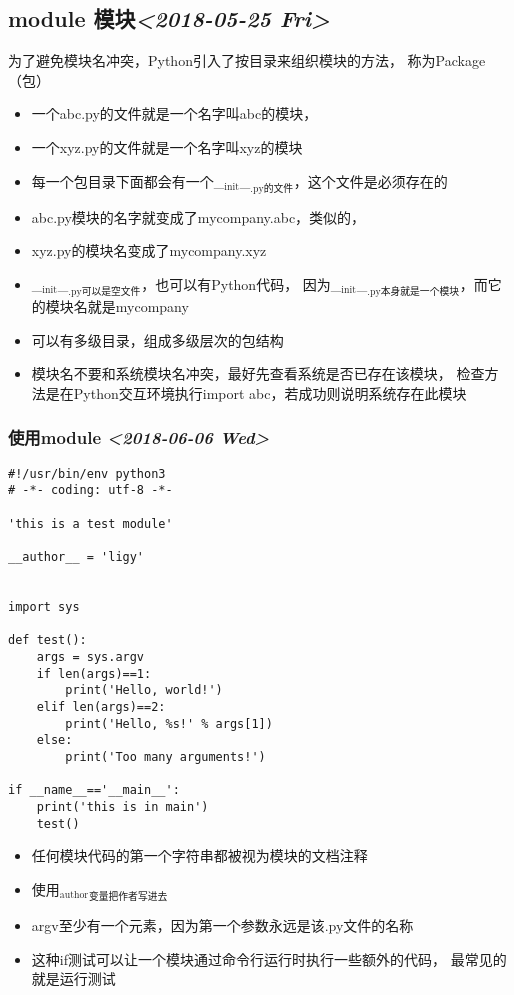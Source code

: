 \documentclass[11pt]{article}
\begin{document}
\subsection{module 模块\textit{<2018-05-25 Fri>}}
\label{sec:orge90aec7}
为了避免模块名冲突，Python引入了按目录来组织模块的方法，
称为Package（包）
\begin{itemize}
\item 一个abc.py的文件就是一个名字叫abc的模块，
\item 一个xyz.py的文件就是一个名字叫xyz的模块
\item 每一个包目录下面都会有一个\_\(_{\text{init}}\)\_\(_{\text{.py的文件}}\)，这个文件是必须存在的
\item abc.py模块的名字就变成了mycompany.abc，类似的，
\item xyz.py的模块名变成了mycompany.xyz
\item \_\(_{\text{init}}\)\_\(_{\text{.py可以是空文件}}\)，也可以有Python代码，
因为\_\(_{\text{init}}\)\_\(_{\text{.py本身就是一个模块}}\)，而它的模块名就是mycompany
\item 可以有多级目录，组成多级层次的包结构
\item 模块名不要和系统模块名冲突，最好先查看系统是否已存在该模块，
检查方法是在Python交互环境执行import abc，若成功则说明系统存在此模块
\end{itemize}
\subsubsection{使用module \textit{<2018-06-06 Wed>}}
\label{sec:orgd647233}
\begin{verbatim}
#!/usr/bin/env python3
# -*- coding: utf-8 -*-

'this is a test module'

__author__ = 'ligy'


import sys

def test():
    args = sys.argv
    if len(args)==1:
        print('Hello, world!')
    elif len(args)==2:
        print('Hello, %s!' % args[1])
    else:
        print('Too many arguments!')

if __name__=='__main__':
    print('this is in main')
    test()
\end{verbatim}
\begin{itemize}
\item 任何模块代码的第一个字符串都被视为模块的文档注释
\item 使用\(_{\text{author}}\)\(_{\text{变量把作者写进去}}\)
\item argv至少有一个元素，因为第一个参数永远是该.py文件的名称
\item 这种if测试可以让一个模块通过命令行运行时执行一些额外的代码，
最常见的就是运行测试
\end{itemize}
\end{document}
